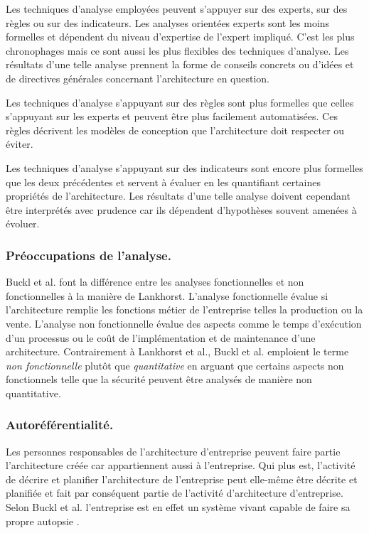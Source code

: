 Les techniques d'analyse employées peuvent s'appuyer sur des experts, sur des
règles ou sur des indicateurs. Les analyses orientées experts sont les moins
formelles et dépendent du niveau d'expertise de l'expert impliqué. C'est les
plus chronophages mais ce sont aussi les plus flexibles des techniques
d'analyse. Les résultats d'une telle analyse prennent la forme de conseils
concrets ou d'idées et de directives générales concernant l'architecture en
question.

Les techniques d'analyse s'appuyant sur des règles sont plus formelles que
celles s'appuyant sur les experts et peuvent être plus facilement automatisées.
Ces règles décrivent les modèles de conception que l'architecture doit
respecter ou éviter. 

Les techniques d'analyse s'appuyant sur des indicateurs sont encore plus
formelles que les deux précédentes et servent à évaluer en les quantifiant
certaines propriétés de l'architecture. Les résultats d'une telle analyse
doivent cependant être interprétés avec prudence car ils dépendent d'hypothèses
souvent amenées à évoluer.

\subsubsection{Préoccupations de l'analyse.}

Buckl et al. font la différence entre les analyses fonctionnelles et non
fonctionnelles à la manière de Lankhorst.  L'analyse fonctionnelle évalue si
l'architecture remplie les fonctions métier de l'entreprise telles la
production ou la vente. L'analyse non fonctionnelle évalue des aspects comme le
temps d'exécution d'un processus ou le coût de l'implémentation et de
maintenance d'une architecture. Contrairement à Lankhorst et al., Buckl et al.
emploient le terme \textit{non fonctionnelle} plutôt que \textit{quantitative}
en arguant que certains aspects non fonctionnels telle que la sécurité peuvent
être analysés de manière non quantitative. 

\subsubsection{Autoréférentialité.}

Les personnes responsables de l'architecture d'entreprise peuvent faire partie
l'architecture créée car appartiennent aussi à l'entreprise. Qui plus est,
l'activité de décrire et planifier l'architecture de l'entreprise peut
elle-même être décrite et planifiée et fait par conséquent partie de l'activité
d'architecture d'entreprise. Selon Buckl et al.  \cite{varela1974autopoiesis}
l'entreprise est en effet un système vivant capable de faire sa propre autopsie
\cite{varela1974autopoiesis}.

